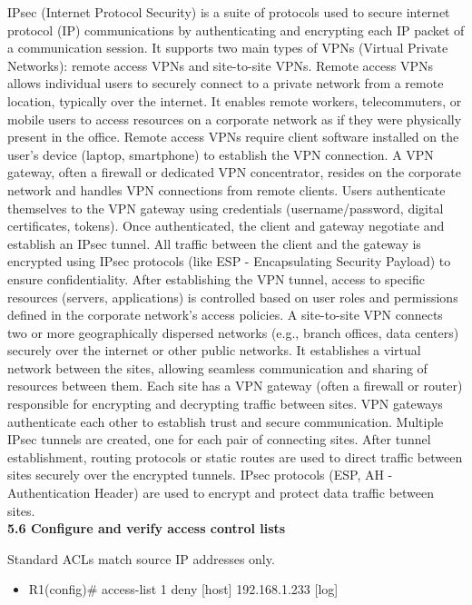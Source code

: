 \documentclass{article}
\begin{document}
	IPsec (Internet Protocol Security) is a suite of protocols used to secure internet protocol (IP) communications by authenticating and encrypting each IP packet of a communication session. It supports two main types of VPNs (Virtual Private Networks): remote access VPNs and site-to-site VPNs. Remote access VPNs allows individual users to securely connect to a private network from a remote location, typically over the internet. It enables remote workers, telecommuters, or mobile users to access resources on a corporate network as if they were physically present in the office. Remote access VPNs require client software installed on the user's device (laptop, smartphone) to establish the VPN connection. A VPN gateway, often a firewall or dedicated VPN concentrator, resides on the corporate network and handles VPN connections from remote clients. Users authenticate themselves to the VPN gateway using credentials (username/password, digital certificates, tokens). Once authenticated, the client and gateway negotiate and establish an IPsec tunnel. All traffic between the client and the gateway is encrypted using IPsec protocols (like ESP - Encapsulating Security Payload) to ensure confidentiality. After establishing the VPN tunnel, access to specific resources (servers, applications) is controlled based on user roles and permissions defined in the corporate network's access policies. A site-to-site VPN connects two or more geographically dispersed networks (e.g., branch offices, data centers) securely over the internet or other public networks. It establishes a virtual network between the sites, allowing seamless communication and sharing of resources between them. Each site has a VPN gateway (often a firewall or router) responsible for encrypting and decrypting traffic between sites. VPN gateways authenticate each other to establish trust and secure communication. Multiple IPsec tunnels are created, one for each pair of connecting sites. After tunnel establishment, routing protocols or static routes are used to direct traffic between sites securely over the encrypted tunnels. IPsec protocols (ESP, AH - Authentication Header) are used to encrypt and protect data traffic between sites.\\
  
\textbf{5.6 Configure and verify access control lists}

Standard ACLs match source IP addresses only.
\begin{itemize}
\item R1(config)\# access-list 1 deny [host] 192.168.1.233 [log]
\end{itemize}
	
\end{document}
